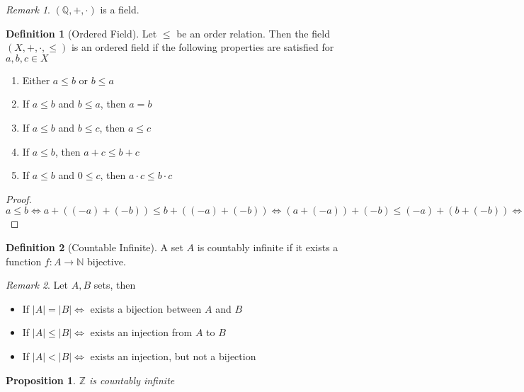 \documentclass{article}
\newenvironment{enumrom}{\begin{enumerate}[label=(\roman*)]}{\end{enumerate}}
\newcommand{\fToN}[2]{#1 : #2 \rightarrow \mathbb{N}}
\theoremstyle{definition}
\newtheorem{definition}{Definition}[section]
\theoremstyle{definition}
\theoremstyle{plain}
\theoremstyle{plain}
\theoremstyle{plain}
\theoremstyle{plain}
\newtheorem{proposition}[theorem]{Proposition}
\theoremstyle{definition}
\theoremstyle{remark}
\theoremstyle{remark}
\theoremstyle{remark}
\theoremstyle{remark}
\newtheorem*{remark}{Remark}
\newcommand{\Z}{\mathbb{Z}}
\newcommand{\Q}{\mathbb{Q}}
\begin{document}
\begin{remark}
  $(\Q, +, \cdot)$ is a field.
\end{remark}


\begin{definition}[Ordered Field]
  Let $\leq$ be an order relation. Then the field $(X, +, \cdot, \leq)$ is an ordered field if the following properties are satisfied for $a, b, c\in X$
  \begin{enumrom}
  \item Either $a \leq b$ or $b \leq a$
  \item If $a \leq b$ and $b \leq a$, then $a = b$
  \item If $a \leq b$ and $b \leq c$, then $a \leq c$
  \item If $a \leq b$, then $a + c \leq b + c$
  \item If $a \leq b$ and $0 \leq c$, then $a \cdot c \leq b \cdot c$
  \end{enumrom}
\end{definition}


\begin{proof}
  $a \leq b \iff a + ((-a) + (-b)) \leq b + ((-a) + (-b)) \iff (a + (-a)) + (-b) \leq (-a) + (b + (-b)) \iff (-b) + 0 \leq (-a) + 0 \iff (-b) \leq (-a)$
\end{proof}


\begin{definition}[Countable Infinite]
  A set $A$ is countably infinite if it exists a function $\fToN{f}{A}$ bijective.
\end{definition}

\begin{remark}
  Let $A, B$ sets, then
  \begin{itemize}
  \item If $|A| = |B| \iff$ exists a bijection between $A$ and $B$
  \item If $|A| \leq |B| \iff$ exists an injection from $A$ to $B$
  \item If $|A| < |B| \iff$ exists an injection, but not a bijection
  \end{itemize}
\end{remark}


\begin{proposition}
  $\Z$ is countably infinite
\end{proposition}
\end{document}
